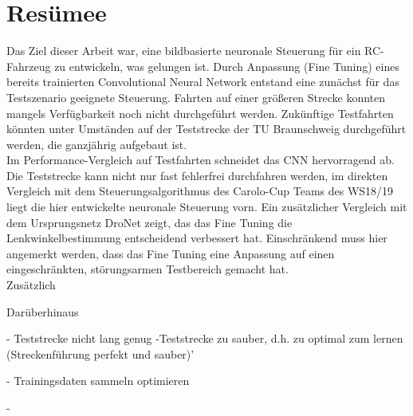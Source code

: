 %
\chapter{Resümee}

Das Ziel dieser Arbeit war, eine bildbasierte neuronale Steuerung für ein RC-Fahrzeug zu entwickeln, was gelungen ist. Durch Anpassung (Fine Tuning) eines bereits trainierten Convolutional Neural Network entstand eine zunächst für das Testszenario geeignete Steuerung. Fahrten auf einer größeren Strecke konnten mangels Verfügbarkeit noch nicht durchgeführt werden. Zukünftige Testfahrten könnten unter Umständen auf der Teststrecke der TU Braunschweig durchgeführt werden, die ganzjährig aufgebaut ist.\\
Im Performance-Vergleich auf Testfahrten schneidet das CNN hervorragend ab. Die Teststrecke kann nicht nur fast fehlerfrei durchfahren werden, im direkten Vergleich mit dem Steuerungsalgorithmus des Carolo-Cup Teams des WS18/19 liegt die hier entwickelte neuronale Steuerung vorn. Ein zusätzlicher Vergleich mit dem Ursprungsnetz DroNet zeigt, das das Fine Tuning die Lenkwinkelbestimmung entscheidend verbessert hat. Einschränkend muss hier angemerkt werden, dass das Fine Tuning eine Anpassung auf einen eingeschränkten, störungsarmen Testbereich gemacht hat.\\
Zusätzlich 

Darüberhinaus






- Teststrecke nicht lang genug 
-Teststrecke zu sauber, d.h. zu optimal zum lernen (Streckenführung perfekt und sauber)'

- Trainingsdaten sammeln optimieren

- 